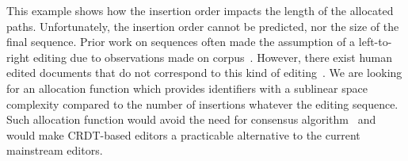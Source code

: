 This example shows how the insertion order impacts the length of the allocated
paths. Unfortunately, the insertion order cannot be predicted, nor the size of
the final sequence. Prior work on sequences often made the assumption of a
left-to-right editing due to observations made on
corpus~\cite{preguica2009commutative, weiss2009logoot}. However, there exist
human edited documents that do not correspond to this kind of
editing~\cite{nedelec2013lseq}.
We are looking for an allocation function which provides identifiers with a
sublinear space complexity compared to the number of insertions whatever the
editing sequence. Such allocation function would avoid the need for consensus
algorithm~\cite{mostefaoui2015signature} and would make CRDT-based editors a
practicable alternative to the current mainstream editors.
 
